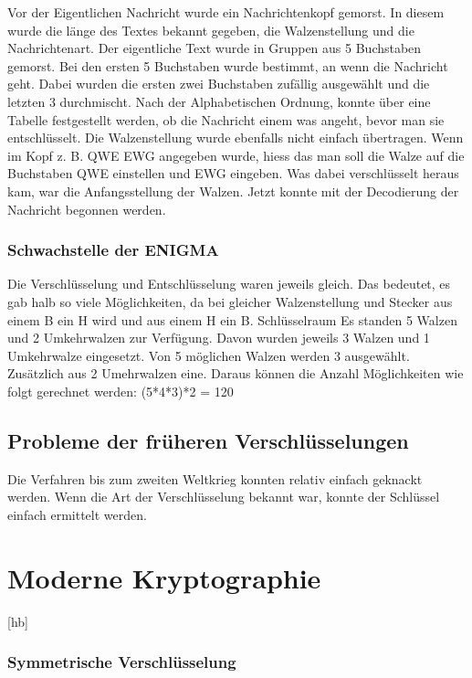 Vor der Eigentlichen Nachricht wurde ein Nachrichtenkopf gemorst. In diesem wurde die länge des Textes bekannt gegeben, die Walzenstellung und die Nachrichtenart. 
Der eigentliche Text wurde in Gruppen aus 5 Buchstaben gemorst. Bei den ersten 5 Buchstaben wurde bestimmt, an wenn die Nachricht geht. Dabei wurden die ersten zwei Buchstaben zufällig ausgewählt und die letzten 3 durchmischt. Nach der Alphabetischen Ordnung, konnte über eine Tabelle festgestellt werden, ob die Nachricht einem was angeht, bevor man sie entschlüsselt.
Die Walzenstellung wurde ebenfalls nicht einfach übertragen. Wenn im Kopf z. B. QWE EWG angegeben wurde, hiess das man soll die Walze auf die Buchstaben QWE einstellen und EWG eingeben. Was dabei verschlüsselt heraus kam, war die Anfangsstellung der Walzen. Jetzt konnte mit der Decodierung der Nachricht begonnen werden.

\subsubsection{Schwachstelle der ENIGMA}
Die Verschlüsselung und Entschlüsselung waren jeweils gleich. Das bedeutet, es gab halb so viele Möglichkeiten, da bei gleicher Walzenstellung und Stecker aus einem B ein H wird und aus einem H ein B. 
Schlüsselraum
Es standen 5 Walzen und 2 Umkehrwalzen zur Verfügung. Davon wurden jeweils 3 Walzen und 1 Umkehrwalze eingesetzt. 
Von 5 möglichen Walzen werden 3 ausgewählt. Zusätzlich aus 2 Umehrwalzen eine. 
Daraus können die Anzahl Möglichkeiten wie folgt gerechnet werden: 
(5*4*3)*2 = 120




\subsection{Probleme der früheren Verschlüsselungen}
Die Verfahren bis zum zweiten Weltkrieg konnten relativ einfach geknackt werden. Wenn die Art der Verschlüsselung bekannt war, konnte der Schlüssel einfach ermittelt werden. 



\section{Moderne Kryptographie}[hb]

\subsubsection{Symmetrische Verschlüsselung}
